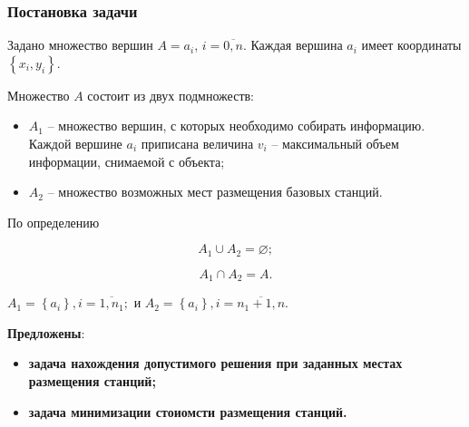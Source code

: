 \begin{frame}
    \frametitle{Постановка задачи}
    \fontsize{8pt}{7.2}\selectfont
    \justifying
    Задано множество вершин $A = a_i$, $i=\overline{0,n}$. Каждая вершина $a_i$ имеет координаты $\left\{ x_i, y_i \right\}$.
    
    \begin{minipage}[c]{0.47\linewidth}
        \fontsize{8pt}{7.2}\selectfont

        Множество $A$ состоит из двух подмножеств: 
        \begin{itemize}
        \item $A_1$ -- множество вершин, с которых необходимо собирать информацию. Каждой вершине $a_i$ приписана   величина $v_i$ -- максимальный объем информации, снимаемой с объекта;
        \item $A_2$ -- множество возможных мест размещения базовых станций. 
        \end{itemize}

        По определению

        $$
        A_1 \cup A_2 = \varnothing;
        $$

        $$
        A_1 \cap A_2 = A.
        $$

        
    \end{minipage}
    \begin{minipage}[c]{0.47\linewidth}
    \end{minipage}
    

    $
    A_1 = \left\{a_i \right\}, i= \overline{1,n_1};
    $ и $
    A_2 = \left\{ a_i  \right\}, i= \overline{n_1+1,n}.
    $

    \textbf{Предложены}:
    \begin{itemize}
        \item \textbf{задача нахождения допустимого решения при заданных местах размещения станций;}
        \item \textbf{задача минимизации стоиомсти размещения станций.}
    \end{itemize}
    
\end{frame}

